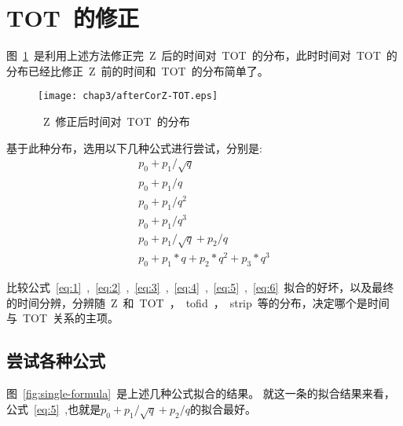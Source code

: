 \section{TOT~的修正}

图~\ref{fig:afterCorZ-TOT}~是利用上述方法修正完~Z~后的时间对~TOT~的分布，此时时间对~TOT~的分布已经比修正~Z~前的时间和~TOT~的分布简单了。

\begin{figure}[htbp]
\centering
\texttt{[image: chap3/afterCorZ-TOT.eps]}
\caption{~Z~修正后时间对~TOT~的分布}
\label{fig:afterCorZ-TOT}
\end{figure}

基于此种分布，选用以下几种公式进行尝试，分别是:
\begin{align}
p_{0}+p_{1}/\sqrt{q}
\label{eq:1}\\
p_{0}+p_{1}/q
\label{eq:2}\\
p_{0}+p_{1}/q^{2}
\label{eq:3}\\
p_{0}+p_{1}/q^{3}
\label{eq:4}\\
p_{0}+p_{1}/\sqrt{q}+p_{2}/q
\label{eq:5}\\
p_{0}+p_{1}*q+p_{2}*q^{2}+p_{3}*q^3
\label{eq:6}    
\end{align}

比较公式~\ref{eq:1}~,~\ref{eq:2}~,~\ref{eq:3}~,~\ref{eq:4}~,~\ref{eq:5}~,~\ref{eq:6}~拟合的好坏，以及最终的时间分辨，分辨随~Z~和~TOT~，~tofid~，~strip~等的分布，决定哪个是时间与~TOT~关系的主项。

\subsection{尝试各种公式}

图~\ref{fig:single-formula}~是上述几种公式拟合的结果。
就这一条的拟合结果来看，公式~\ref{eq:5}~,也就是${p_{0}+p_{1}/\sqrt{q}+p_{2}/q}$的拟合最好。

